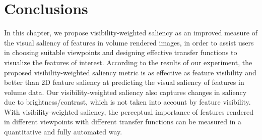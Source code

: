 \section{Conclusions}
In this chapter, we propose visibility-weighted saliency as an improved measure of the visual saliency of features in volume rendered images, in order to assist users in choosing suitable viewpoints and designing effective transfer functions to visualize the features of interest.
According to the results of our experiment, the proposed visibility-weighted saliency metric is as effective as feature visibility and better than 2D feature saliency at predicting the visual saliency of features in volume data. Our visibility-weighted saliency also captures changes in saliency due to brightness/contrast, which is not taken into account by feature visibility.
With visibility-weighted saliency, the perceptual importance of features rendered in different viewpoints with different transfer functions can be measured in a quantitative and fully automated way.
